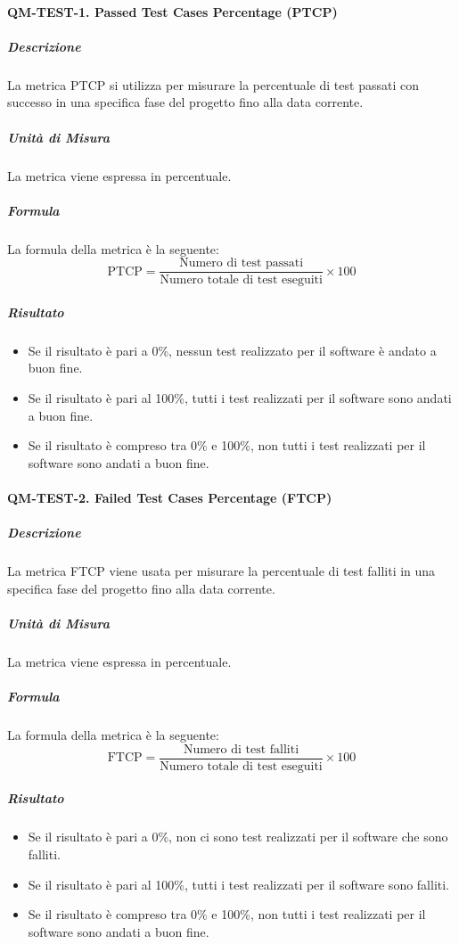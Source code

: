 		\paragraph{QM-TEST-1. Passed Test Cases Percentage (PTCP)}

			\subparagraph{Descrizione}
			La metrica PTCP si utilizza per misurare la percentuale di test passati con successo in una specifica fase del progetto fino alla data corrente.

			\subparagraph{Unità di Misura}
			La metrica viene espressa in percentuale.

			\subparagraph{Formula}
			La formula della metrica è la seguente:
			\[
				\text{PTCP} = \frac{\text{Numero di test passati}}{\text{Numero totale di test eseguiti}} \times 100
			\]

			\subparagraph{Risultato}
			\begin{itemize}
				\item Se il risultato è pari a 0\%, nessun test realizzato per il software è andato a buon fine.
				\item Se il risultato è pari al 100\%, tutti i test realizzati per il software sono andati a buon fine.
				\item Se il risultato è compreso tra 0\% e 100\%, non tutti i test realizzati per il software sono andati a buon fine.
			\end{itemize}

		\paragraph{QM-TEST-2. Failed Test Cases Percentage (FTCP)}

			\subparagraph{Descrizione}
			La metrica FTCP viene usata per misurare la percentuale di test falliti in una specifica fase del progetto fino alla data corrente.

			\subparagraph{Unità di Misura}
			La metrica viene espressa in percentuale.

			\subparagraph{Formula}
			La formula della metrica è la seguente:
			\[
				\text{FTCP} = \frac{\text{Numero di test falliti}}{\text{Numero totale di test eseguiti}} \times 100
			\]

			\subparagraph{Risultato}
			\begin{itemize}
				\item Se il risultato è pari a 0\%, non ci sono test realizzati per il software che sono falliti.
				\item Se il risultato è pari al 100\%, tutti i test realizzati per il software sono falliti.
				\item Se il risultato è compreso tra 0\% e 100\%, non tutti i test realizzati per il software sono andati a buon fine.
			\end{itemize}

